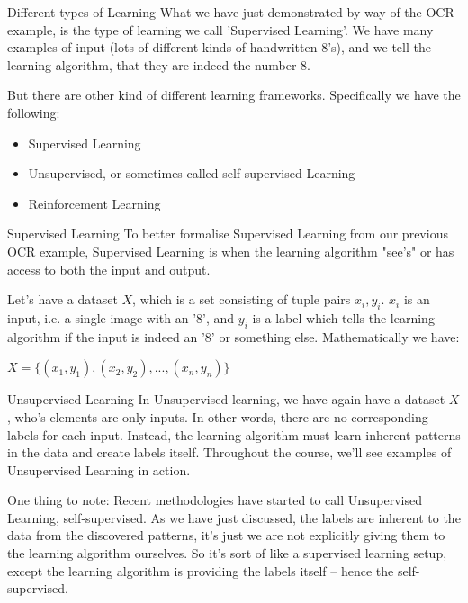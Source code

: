 \documentclass[10pt]{beamer}
\begin{document}
\begin{frame}[label={sec:orgb265e49}]{Different types of Learning}
What we have just demonstrated by way of the OCR example, is the type of learning we
call 'Supervised Learning'. We have many examples of input (lots of different kinds
of handwritten 8's), and we tell the learning algorithm, that they are indeed the
number 8.

But there are other kind of different learning frameworks. Specifically we have the
following:

\begin{itemize}
\item Supervised Learning
\item Unsupervised, or sometimes called self-supervised Learning
\item Reinforcement Learning
\end{itemize}
\end{frame}

\begin{frame}[label={sec:org29aee83}]{Supervised Learning}
To better formalise Supervised Learning from our previous OCR example, Supervised
Learning is when the learning algorithm "see's" or has access to both the input and
output.

Let's have a dataset \(X\), which is a set consisting of tuple pairs \(x_i, y_i\). \(x_i\)
is an input, i.e. a single image with an '8', and \(y_i\) is a label which tells the
learning algorithm if the input is indeed an '8' or something else. Mathematically we have:

\(X = \{(x_1, y_1), (x_2, y_2), ..., (x_n, y_n)\}\)
\end{frame}

\begin{frame}[label={sec:orgcc94bab}]{Unsupervised Learning}
In Unsupervised learning, we have again have a dataset \(X\), who's elements are only
inputs. In other words, there are no corresponding labels for each input. Instead,
the learning algorithm must learn inherent patterns in the data and create labels
itself. Throughout the course, we'll see examples of Unsupervised Learning in action.

One thing to note: Recent methodologies have started to call Unsupervised Learning,
self-supervised. As we have just discussed, the labels are inherent to the data from
the discovered patterns, it's just we are not explicitly giving them to the learning
algorithm ourselves. So it's sort of like a supervised learning setup, except the
learning algorithm is providing the labels itself -- hence the self-supervised.
\end{frame}
\end{document}
